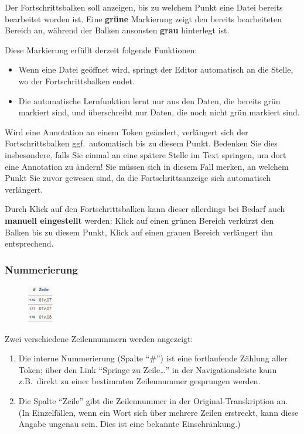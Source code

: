 \documentclass[11pt,a4paper,parskip=half]{scrartcl}
\begin{document}
Der Fortschrittsbalken soll anzeigen, bis zu welchem Punkt eine Datei
bereits bearbeitet worden ist.  Eine \textbf{grüne} Markierung zeigt
den bereits bearbeiteten Bereich an, während der Balken ansonsten
\textbf{grau} hinterlegt ist.

Diese Markierung erfüllt derzeit folgende Funktionen:
\begin{itemize}
\item Wenn eine Datei geöffnet wird, springt der Editor automatisch an
  die Stelle, wo der Fortschrittsbalken endet.
\item Die automatische Lernfunktion lernt nur aus den Daten, die bereits grün
  markiert sind, und überschreibt nur Daten, die noch nicht grün markiert sind.
\end{itemize}

Wird eine Annotation an einem Token geändert, verlängert sich der
Fortschrittsbalken ggf.\ automatisch bis zu diesem Punkt.  Bedenken
Sie dies insbesondere, falls Sie einmal an eine spätere Stelle im Text
springen, um dort eine Annotation zu ändern!  Sie müssen sich in
diesem Fall merken, an welchem Punkt Sie zuvor gewesen sind, da die
Fortschrittsanzeige sich automatisch verlängert.

Durch Klick auf den Fortschrittsbalken kann dieser allerdings bei
Bedarf auch \textbf{manuell eingestellt} werden: Klick auf einen grünen Bereich
verkürzt den Balken bis zu diesem Punkt, Klick auf einen grauen
Bereich verlängert ihn entsprechend.


\subsubsection{Nummerierung}

\begin{figure}
  \begin{center}\vspace{-2em}
    \includegraphics[width=0.1\textwidth]{img/zeile.png}
  \end{center}
\end{figure}

Zwei verschiedene Zeilennummern werden angezeigt:
\begin{enumerate}
\item Die interne Nummerierung (Spalte "`\#"') ist eine fortlaufende
  Zählung aller Token; über den Link "`Springe zu Zeile\ldots"' in der
  Navigationsleiste kann z.B.\ direkt zu einer bestimmten Zeilennummer
  gesprungen werden.
\item Die Spalte "`Zeile"' gibt die Zeilennummer in der
  Original-Transkription an. (In Einzelfällen, wenn ein Wort sich über
  mehrere Zeilen erstreckt, kann diese Angabe ungenau sein. Dies ist
  eine bekannte Einschränkung.)
\end{enumerate}
\end{document}
